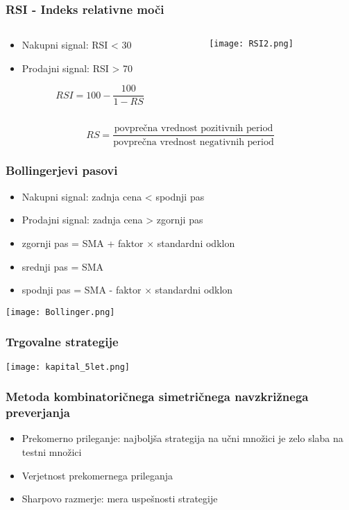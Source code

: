 \documentclass{beamer}
\begin{document}
\begin{frame}
\frametitle{RSI - Indeks relativne moči}
\begin{columns}
\begin{column}{5cm}
\begin{itemize}
\item Nakupni signal: RSI < 30
\item Prodajni signal: RSI > 70
\end{itemize}

$$RSI = 100 - \frac{100}{1-RS}$$

\end{column}

\begin{column}{6.3cm}
\texttt{[image: RSI2.png]}
\end{column}
\end{columns}
\vspace{0.5cm}
$$RS = \frac{\textrm{povprečna vrednost pozitivnih period}}{\textrm{povprečna vrednost negativnih period}}$$
\end{frame}


\begin{frame}
\frametitle{Bollingerjevi pasovi}
\begin{itemize}
\item Nakupni signal: zadnja cena < spodnji pas
\item Prodajni signal: zadnja cena > zgornji pas
\end{itemize}
\begin{itemize}
\item zgornji pas = SMA + faktor $\times$ standardni odklon
\item srednji pas = SMA
\item spodnji pas = SMA - faktor $\times$ standardni odklon
\end{itemize}
\texttt{[image: Bollinger.png]}

\end{frame}


\begin{frame}
\frametitle{Trgovalne strategije}
\texttt{[image: kapital\_5let.png]}
\end{frame}

\begin{frame}
\frametitle{Metoda kombinatoričnega simetričnega navzkrižnega preverjanja}
\begin{itemize}
\item Prekomerno prileganje: najboljša strategija na učni množici je zelo slaba na testni množici
\item Verjetnost prekomernega prileganja
\item Sharpovo razmerje: mera uspešnosti strategije
\end{itemize}
\end{frame}
\end{document}
